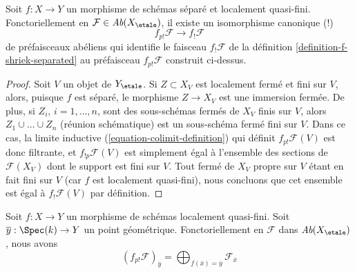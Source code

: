 \begin{lemma}
\label{lemma-finite-support-f-shriek-separated}
Soit $f : X \to Y$ un morphisme de schémas séparé et localement
quasi-fini. Fonctoriellement en $\mathcal{F} \in \textit{Ab}(X_\etale)$,
il existe un isomorphisme canonique (!)
$$
f_{p!}\mathcal{F} \longrightarrow f_!\mathcal{F}
$$
de préfaisceaux abéliens qui identifie le faisceau
$f_!\mathcal{F}$ de la définition \ref{definition-f-shriek-separated}
au préfaisceau $f_{p!}\mathcal{F}$ construit ci-dessus.
\end{lemma}

\begin{proof}
Soit $V$ un objet de $Y_\etale$. Si $Z \subset X_V$ est localement fermé
et fini sur $V$, alors, puisque $f$ est séparé, le
morphisme $Z \to X_V$ est une immersion fermée. De plus, si
$Z_i$, $i = 1, \ldots, n$, sont des sous-schémas fermés de $X_V$ finis
sur $V$, alors $Z_1 \cup \ldots \cup Z_n$ (réunion schématique)
est un sous-schéma fermé fini sur $V$. Dans ce cas, la limite inductive
(\ref{equation-colimit-definition}) qui définit $f_{p!}\mathcal{F}(V)$
est donc filtrante, et $f_{!p}\mathcal{F}(V)$ est simplement égal
à l'ensemble des sections de $\mathcal{F}(X_V)$ dont le support est fini sur $V$.
Tout fermé de $X_V$ propre sur $V$ étant
en fait fini sur $V$ (car $f$ est localement quasi-fini),
nous concluons que cet ensemble est égal à $f_!\mathcal{F}(V)$
par définition.
\end{proof}

\begin{lemma}
\label{lemma-finite-support-stalk}
Soit $f : X \to Y$ un morphisme de schémas localement quasi-fini.
Soit $\overline{y} : \Spec(k) \to Y$ un point géométrique.
Fonctoriellement en $\mathcal{F}$ dans $\textit{Ab}(X_\etale)$, nous avons
$$
(f_{p!}\mathcal{F})_{\overline{y}} =
\bigoplus\nolimits_{f(\overline{x}) = \overline{y}} \mathcal{F}_{\overline{x}}
$$
\end{lemma}

